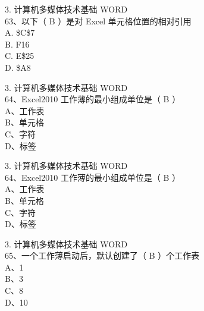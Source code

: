 \documentclass[aspectratio=169]{beamer}
\begin{document}
\begin{frame}[t]{3. 计算机多媒体技术基础} \vspace{20pt}
    WORD\\
63、以下（ B ）是对 Excel 单元格位置的相对引用\\
A. \$C\$7 \\
    B. F16 \\
    C. E\$25 \\
    D. \$A8\\
\end{frame}


\begin{frame}[t]{3. 计算机多媒体技术基础} \vspace{20pt}
    WORD\\

64、Excel2010 工作薄的最小组成单位是（ B ）\\
A、工作表\\ B、单元格\\ C、字符\\ D、标签\\
\end{frame}




\begin{frame}[t]{3. 计算机多媒体技术基础} \vspace{20pt}
    WORD\\

64、Excel2010 工作薄的最小组成单位是（ B ）\\
A、工作表\\ B、单元格\\ C、字符\\ D、标签\\
\end{frame}




\begin{frame}[t]{3. 计算机多媒体技术基础} \vspace{20pt}
    WORD\\

65、一个工作薄启动后，默认创建了（ B ）个工作表\\
A、1\\ B、3\\ C、8\\ D、10\\
\end{frame}
\end{document}
